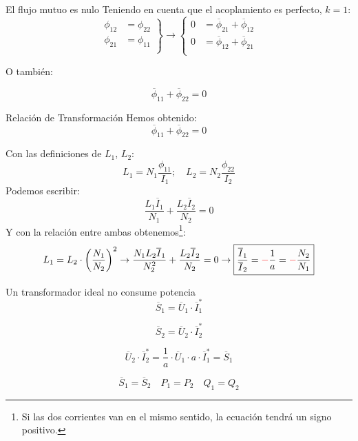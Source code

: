 \documentclass[aspectratio=169, usenames,svgnames,dvipsnames]{beamer}
\begin{document}
\begin{frame}[label={sec:orga092a16}]{El flujo mutuo es nulo}
Teniendo en cuenta que el acoplamiento es perfecto, \(k = 1\):
\[
  \left.
    \begin{array}{ll}
      \phi_{12} &= \phi_{22}\\
      \phi_{21} &= \phi_{11}\\
    \end{array} \right\} 
  \rightarrow
  \left\{
    \begin{array}{ll}
      0 &= \overline{\phi}_{21} + \overline{\phi}_{12}\\
      0 &= \overline{\phi}_{12} + \overline{\phi}_{21}\\
    \end{array}\right.
\]

O también:

\[
  \boxed{\overline{\phi}_{11} + \overline{\phi}_{22} = 0}
\]
\end{frame}
\begin{frame}[label={sec:org37734c3}]{Relación de Transformación}
Hemos obtenido:
\[
  \overline{\phi}_{11} + \overline{\phi}_{22} = 0
\]

Con las definiciones de \(L_1\), \(L_2\):
\[
  L_1 = N_1 \frac{\phi_{11}}{I_1}; \quad L_2 = N_2 \frac{\phi_{22}}{I_2}
\]
Podemos escribir:
\[
  \frac{L_1 \overline{I}_1}{N_1} + \frac{L_2 \overline{I}_2}{N_2} = 0
\]
Y con la relación entre ambas obtenemos\footnote{Si las dos corrientes van en el mismo sentido, la ecuación tendrá un signo positivo.}:
\[
  L_1 = L_2 \cdot \left(\frac{N_1}{N_2}\right)^2
  \rightarrow
  \frac{N_1L_2 \overline{I}_1}{N^2_2} + \frac{L_2 \overline{I}_2}{N_2} = 0
  \rightarrow
  \boxed{\frac{\overline{I}_1}{\overline{I}_2} = {\color{red}-} \frac{1}{a} = {\color{red}-} \frac{N_2}{N_1}}
\]
\end{frame}
\begin{frame}[label={sec:orgf3357c7}]{Un transformador ideal no consume potencia}
\[
  \overline{S}_1 = \overline{U}_1 \cdot \overline{I}_1^*
\]

\[
  \overline{S}_2 = \overline{U}_2 \cdot \overline{I}_2^* 
\]

\[
  \overline{U}_2 \cdot \overline{I}_2^* = \frac{1}{a} \cdot \overline{U}_1 \cdot a \cdot \overline{I}_1^* = \overline{S}_1
\]

\[
  \boxed{\overline{S}_1 = \overline{S}_2}
  \quad
  \boxed{P_1 = P_2}
  \quad
  \boxed{Q_1 = Q_2}
\]
\end{frame}
\end{document}
